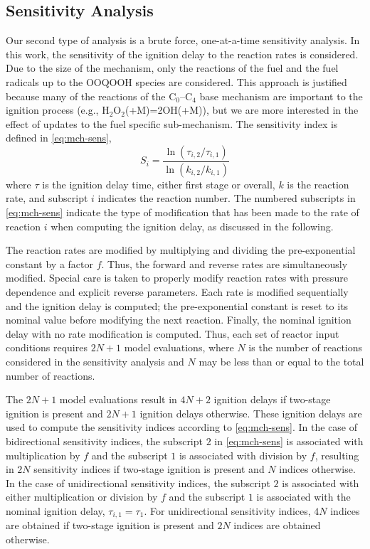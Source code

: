 \documentclass[../main.tex]{subfiles}
\begin{document}
\subsection{Sensitivity Analysis}
\label{sec:mch-sensitivity-analysis}

Our second type of analysis is a brute force, one-at-a-time sensitivity
analysis. In this work, the sensitivity of the ignition delay to the reaction
rates is considered. Due to the size of the mechanism, only the reactions of
the fuel and the fuel radicals up to the OOQOOH species are considered. This
approach is justified because many of the reactions of the C$_0$--C$_4$ base
mechanism are important to the ignition process (e.g.,
H$_2$O$_2$(+M)=2OH(+M)), but we are more interested in the effect of updates to
the fuel specific sub-mechanism. The sensitivity index is defined in
\cref{eq:mch-sens},
%
\begin{equation}
    \label{eq:mch-sens}
    S_i = \frac{\ln\left(\tau_{i,2}/\tau_{i,1}\right)}{\ln\left(k_{i,2}/k_{i,1}\right)}
\end{equation}
%
where $\tau$ is the ignition delay time, either first stage or overall, $k$ is
the reaction rate, and subscript $i$ indicates the reaction number. The
numbered subscripts in \cref{eq:mch-sens} indicate the type of modification
that has been made to the rate of reaction $i$ when computing the ignition
delay, as discussed in the following.

The reaction rates are modified by multiplying and dividing the pre-exponential
constant by a factor $f$. Thus, the forward and reverse rates are
simultaneously modified. Special care is taken to properly modify reaction
rates with pressure dependence and explicit reverse parameters. Each rate is
modified sequentially and the ignition delay is computed; the pre-exponential
constant is reset to its nominal value before modifying the next reaction.
Finally, the nominal ignition delay with no rate modification is computed.
Thus, each set of reactor input conditions requires $2N+1$ model evaluations,
where $N$ is the number of reactions considered in the sensitivity analysis
and $N$ may be less than or equal to the total number of reactions.

The $2N+1$ model evaluations result in $4N+2$ ignition delays if two-stage
ignition is present and $2N+1$ ignition delays otherwise. These ignition delays
are used to compute the sensitivity indices according to \cref{eq:mch-sens}.
In the case of bidirectional sensitivity indices, the subscript $2$ in
\cref{eq:mch-sens} is associated with multiplication by $f$ and the subscript
$1$ is associated with division by $f$, resulting in $2N$ sensitivity indices if
two-stage ignition is present and $N$ indices otherwise. In the case of
unidirectional sensitivity indices, the subscript $2$ is associated with either
multiplication or division by $f$ and the subscript $1$ is associated with the
nominal ignition delay, $\tau_{i,1}=\tau_1$. For unidirectional sensitivity
indices, $4N$ indices are obtained if two-stage ignition is present and 
$2N$ indices are obtained otherwise.
\end{document}
